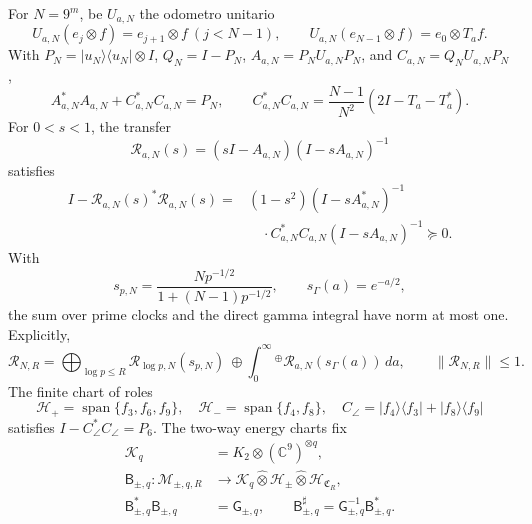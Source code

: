 For \(N=9^m\), be \(U_{a,N}\) the odometro unitario
\[
 U_{a,N}(e_j\otimes f)=e_{j+1}\otimes f\ (j<N-1),
 \qquad U_{a,N}(e_{N-1}\otimes f)=e_0\otimes T_af.
\]
With \(P_N=|u_N\rangle\langle u_N|\otimes I\), \(Q_N=I-P_N\),
\(A_{a,N}=P_NU_{a,N}P_N\), and \(C_{a,N}=Q_NU_{a,N}P_N\),
\begin{equation}\label{eq:pdf2-rh-source-energia}
 A_{a,N}^*A_{a,N}+C_{a,N}^*C_{a,N}=P_N,
 \qquad
 C_{a,N}^*C_{a,N}
 =\frac{N-1}{N^2}(2I-T_a-T_a^*).
\end{equation}
For \(0<s<1\), the transfer
\begin{equation}\label{eq:pdf2-rh-source-redheffer}
 \mathscr R_{a,N}(s)=(sI-A_{a,N})(I-sA_{a,N})^{-1}
\end{equation}
satisfies
\begin{equation}\label{eq:pdf2-rh-source-defecto}
\begin{aligned}
 I-\mathscr R_{a,N}(s)^*\mathscr R_{a,N}(s)
 ={}&(1-s^2)(I-sA_{a,N}^*)^{-1}\\
 &\quad\cdot C_{a,N}^*C_{a,N}(I-sA_{a,N})^{-1}\succeq0.
\end{aligned}
\end{equation}
With
\[
 s_{p,N}=\frac{Np^{-1/2}}{1+(N-1)p^{-1/2}},
 \qquad s_\Gamma(a)=e^{-a/2},
\]
the sum over prime clocks and the direct gamma integral have norm at
most one. Explicitly,
\begin{equation}\label{eq:pdf2-rh-source-relojes}
 \mathscr R_{N,R}
 =\bigoplus_{\log p\leq R}
   \mathscr R_{\log p,N}(s_{p,N})
 \ \oplus\!
 \int_0^\infty{}^\oplus
   \mathscr R_{a,N}(s_\Gamma(a))\,da,
 \qquad \|\mathscr R_{N,R}\|\leq1.
\end{equation}
The finite chart of roles
\[
 \mathcal H_+=\operatorname{span}\{f_3,f_6,f_9\},\quad
 \mathcal H_-=\operatorname{span}\{f_4,f_8\},\quad
 C_\angle=|f_4\rangle\langle f_3|+|f_8\rangle\langle f_9|
\]
satisfies \(I-C_\angle^*C_\angle=P_6\). The two-way energy charts fix
\begin{equation}\label{eq:pdf2-rh-source-cartas}
\begin{aligned}
 \mathcal K_q&=K_2\otimes(\mathbb C^9)^{\otimes q},\\
 \mathsf B_{\pm,q}:\mathcal M_{\pm,q,R}
 &\longrightarrow
 \mathcal K_q\widehat\otimes\mathcal H_\pm
 \widehat\otimes\mathcal H_{\mathfrak C_R},\\
 \mathsf B_{\pm,q}^*\mathsf B_{\pm,q}&=\mathsf G_{\pm,q},
 \qquad
 \mathsf B_{\pm,q}^{\sharp}
 =\mathsf G_{\pm,q}^{-1}\mathsf B_{\pm,q}^*.
\end{aligned}
\end{equation}

